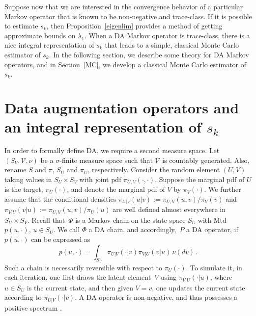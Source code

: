 \documentclass[11pt]{article}
\begin{document}
	
        
        
        
        
        
        
        
        
        
        
        
        
        
        
        
        
	
	
        
	
	
	
	Suppose now that we are interested in the convergence behavior
        of a particular Markov operator that is known to be
        non-negative and trace-class.  If it is possible to estimate
        $s_k$, then Proposition~\ref{eigenlim} provides a method of
        getting approximate bounds on $\lambda_1$.  When a DA Markov
        operator is trace-class, there is a nice integral
        representation of $s_k$ that leads to a simple, classical
        Monte Carlo estimator of $s_k$.  In the following section, we
        describe some theory for DA Markov operators, and in
        Section~\ref{MC}, we develop a classical Monte Carlo estimator
        of $s_k$.

	\section{Data augmentation operators and an integral
          representation of $s_k$} \label{daint}
	
        In order to formally define DA, we require a second measure
        space.  Let $(S_V, \mathcal{V}, \nu)$ be a $\sigma$-finite
        measure space such that $\mathcal{V}$ is countably generated.
        Also, rename $S$ and $\pi$, $S_U$ and $\pi_U$, respectively.
        Consider the random element $(U,V)$ taking values in $S_U
        \times S_V$ with joint pdf $\pi_{U,V}(\cdot,\cdot).$ Suppose
        the marginal pdf of $U$ is the target, $\pi_U(\cdot)$, and
        denote the marginal pdf of $V$ by $\pi_V(\cdot).$ We further
        assume that the conditional densities $\pi_{U|V}(u|v) :=
        \pi_{U,V}(u,v)/\pi_V(v)$ and $\pi_{V|U}(v|u) :=
        \pi_{U,V}(u,v)/\pi_U(u)$ are well defined almost everywhere in
        $S_U \times S_V.$ Recall that~$\Phi$ is a Markov chain on the
        state space $S_U$ with Mtd $p(u,\cdot),\, u \in S_U.$ We call
        $\Phi$ a DA chain, and accordingly,~$P$ a DA operator, if
        $p(u,\cdot)$ can be expressed as
	\begin{equation} \label{DAmtd} p(u,\cdot) = \int_{S_V}
          \pi_{U|V}(\cdot|v) \pi_{V|U}(v|u) \, \nu(dv) \,.
	\end{equation}
	Such a chain is necessarily reversible with respect to $\pi_U(\cdot)$. 
	To simulate it, in each iteration, one first
        draws the latent element~$V$ using $\pi_{V|U}(\cdot|u)$, where
        $u \in S_U$ is the current state, and then given $V=v$, one
        updates the current state according to $\pi_{U|V}(\cdot|v)$.
        A DA operator is non-negative, and thus
        possesses a positive spectrum \citep{liu:wong:kong:1994}.
	
\end{document}
